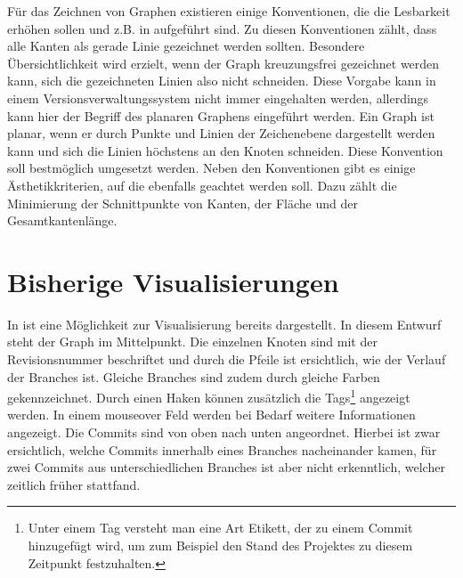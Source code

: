 \documentclass[nocolor]{tudbook}
\begin{document}
Für das Zeichnen von Graphen existieren einige Konventionen, die die Lesbarkeit erhöhen sollen und z.B. in \cite{Aesthetik} aufgeführt sind. Zu diesen Konventionen zählt, dass alle Kanten als gerade Linie gezeichnet werden sollten. Besondere Übersichtlichkeit wird erzielt, wenn der Graph kreuzungsfrei gezeichnet werden kann, sich die gezeichneten Linien also nicht schneiden. Diese Vorgabe kann in einem Versionsverwaltungssystem nicht immer eingehalten werden, allerdings kann hier der Begriff des planaren Graphens eingeführt werden. Ein Graph ist planar, wenn er durch Punkte und Linien der Zeichenebene dargestellt werden kann und sich die Linien höchstens an den Knoten schneiden. Diese Konvention soll bestmöglich umgesetzt werden. Neben den Konventionen gibt es einige Ästhetikkriterien, auf die ebenfalls geachtet werden soll. Dazu zählt die Minimierung der Schnittpunkte von Kanten, der Fläche und der Gesamtkantenlänge.

\section{Bisherige Visualisierungen}
In \cite{Gruppe2.1} ist eine Möglichkeit zur Visualisierung bereits dargestellt. In diesem Entwurf steht der Graph im Mittelpunkt. Die einzelnen Knoten sind mit der Revisionsnummer beschriftet und durch die Pfeile ist ersichtlich, wie der Verlauf der Branches ist. Gleiche Branches sind zudem durch gleiche Farben gekennzeichnet. Durch einen Haken können zusätzlich die Tags\footnote{Unter einem Tag versteht man eine Art Etikett, der zu einem Commit hinzugefügt wird, um zum Beispiel den Stand des Projektes zu diesem Zeitpunkt festzuhalten.} angezeigt werden. In einem mouseover Feld werden bei Bedarf weitere Informationen angezeigt. Die Commits sind von oben nach unten angeordnet. Hierbei ist zwar ersichtlich, welche Commits innerhalb eines Branches nacheinander kamen, für zwei Commits aus unterschiedlichen Branches ist aber nicht erkenntlich, welcher zeitlich früher stattfand.
\end{document}
